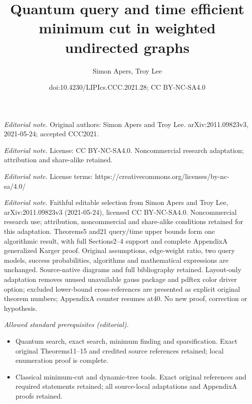 \documentclass[10pt,a4paper]{article}
\title{Quantum query and time efficient minimum cut in weighted undirected graphs}
\author{Simon Apers, Troy Lee}
\date{doi:10.4230/LIPIcs.CCC.2021.28; CC BY-NC-SA4.0}
\newcommand{\1}{\mathbf{1}}
\theoremstyle{definition}
\begin{document}
\maketitle
\noindent\textit{Editorial note.} Original authors: Simon Apers and Troy Lee. arXiv:2011.09823v3, 2021-05-24; accepted CCC2021.\par\medskip
\noindent\textit{Editorial note.} License: CC BY-NC-SA4.0. Noncommercial research adaptation; attribution and share-alike retained.\par\medskip
\noindent\textit{Editorial note.} License terms: https://creativecommons.org/licenses/by-nc-sa/4.0/\par\medskip
\noindent\textit{Editorial note.} Faithful editable selection from Simon Apers and Troy Lee, arXiv:2011.09823v3 (2021-05-24), licensed CC BY-NC-SA4.0. Noncommercial research use; attribution, noncommercial and share-alike conditions retained for this adaptation. Theorems5 and21 query/time upper bounds form one algorithmic result, with full Sections2--4 support and complete AppendixA generalized Karger proof. Original assumptions, edge-weight ratio, two query models, success probabilities, algorithms and mathematical expressions are unchanged. Source-native diagrams and full bibliography retained. Layout-only adaptation removes unused unavailable gauss package and pdftex color driver option; excluded lower-bound cross-references are presented as explicit original theorem numbers; AppendixA counter resumes at40. No new proof, correction or hypothesis.\par\medskip
\noindent\textit{Allowed standard prerequisites (editorial).}\begin{itemize}
\item Quantum search, exact search, minimum finding and sparsification. Exact original Theorems11--15 and credited source references retained; local enumeration proof is complete.
\item Classical minimum-cut and dynamic-tree tools. Exact original references and required statements retained; all source-local adaptations and AppendixA proofs retained.
\end{itemize}\medskip
\end{document}
